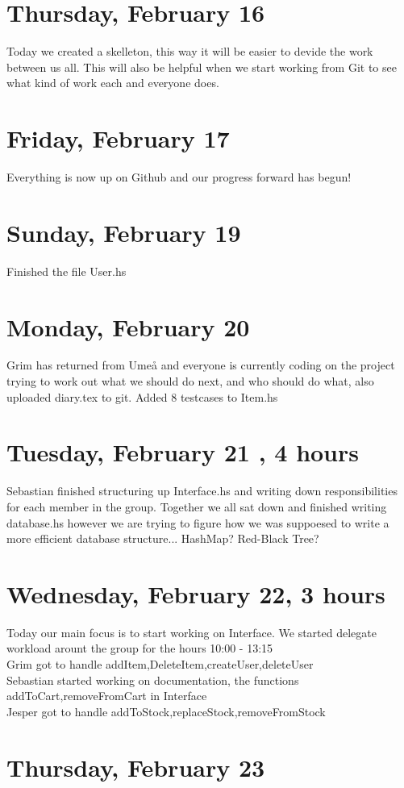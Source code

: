 \documentclass[11pt]{article}
\begin{document}
\section*{Thursday, February 16}
Today we created a skelleton, this way it will be easier to devide the work between us all. This will also be helpful when we start working from Git to see what kind of work each and everyone does.

\section*{Friday, February 17}
Everything is now up on Github and our progress forward has begun!
\section*{Sunday, February 19}
Finished the file User.hs
\section*{Monday, February 20}
Grim has returned from Umeå and everyone is currently coding on the project trying to work out what we should do next, and who should do what, also uploaded diary.tex to git. Added 8 testcases to Item.hs
\section*{Tuesday, February 21 , 4 hours }
Sebastian finished structuring up Interface.hs and writing down responsibilities for each member in the group.
Together we all sat down and finished writing database.hs however we are trying to figure how we was suppoesed to write a more efficient database structure... HashMap? Red-Black Tree?
\section*{Wednesday, February 22, 3 hours }
Today our main focus is to start working on Interface. We started delegate workload arount the group for the hours 10:00 - 13:15 \\
Grim got to handle addItem,DeleteItem,createUser,deleteUser \\
Sebastian started working on documentation, the functions addToCart,removeFromCart in Interface \\
Jesper got to handle addToStock,replaceStock,removeFromStock \\
\section*{Thursday, February 23}
\end{document}
